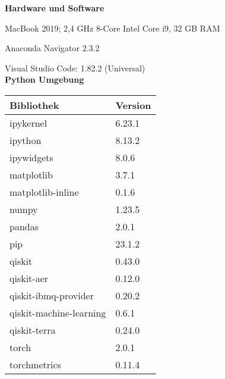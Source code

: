 
\textbf{Hardware und Software}

MacBook 2019;
2,4 GHz 8-Core Intel Core i9,
32 GB RAM

Anaconda Navigator 2.3.2

Visual Studio Code: 1.82.2 (Universal)
\\

\textbf{Python Umgebung}
 
\begin{tabular}{|l|l|}
    \hline
    \textbf{Bibliothek} & \textbf{Version} \\
    \hline
    ipykernel & 6.23.1 \\
    ipython & 8.13.2 \\
    ipywidgets & 8.0.6 \\
    matplotlib & 3.7.1 \\
    matplotlib-inline & 0.1.6 \\
    numpy & 1.23.5 \\
    pandas & 2.0.1 \\
    pip & 23.1.2 \\
    qiskit & 0.43.0 \\
    qiskit-aer & 0.12.0 \\
    qiskit-ibmq-provider & 0.20.2 \\
    qiskit-machine-learning & 0.6.1 \\
    qiskit-terra & 0.24.0 \\
    torch & 2.0.1 \\
    torchmetrics & 0.11.4 \\
    \hline
\end{tabular}
